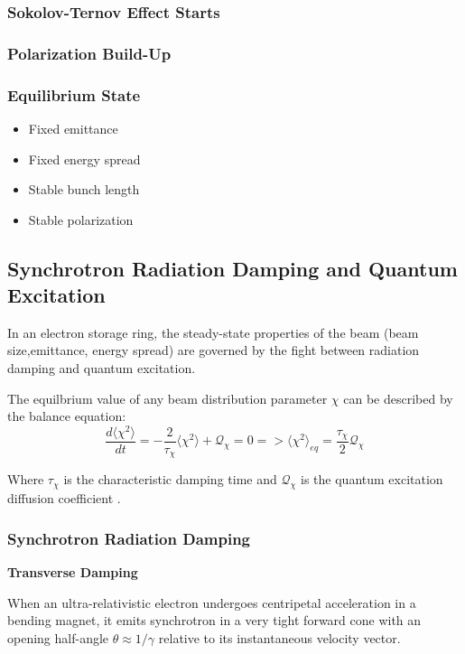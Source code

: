 \documentclass{article}
\begin{document}
\subsubsection{Sokolov-Ternov Effect Starts}

\subsubsection{Polarization Build-Up}

\subsubsection{Equilibrium State}
\begin{itemize}
\item Fixed emittance 
\item Fixed energy spread
\item Stable bunch length
\item Stable polarization
\end{itemize}

\subsection{Synchrotron Radiation Damping and Quantum Excitation}

In an electron storage ring, the steady-state properties of the beam (beam size,emittance, energy spread) are governed by the fight between radiation damping and quantum excitation.

The equilbrium value of any beam distribution parameter $\chi$ can be described by the balance equation:
$$\frac{d \langle \chi^2 \rangle}{dt}=-\frac{2}{\tau_\chi}\langle \chi^2 \rangle + \mathcal{Q}_{\chi}=0 => \langle \chi^2 \rangle_{eq} = \frac{\tau_\chi}{2} \mathcal{Q}_{\chi}$$

Where $\tau_{\chi}$ is the characteristic damping time and $\mathcal{Q}_\chi$ is the quantum excitation diffusion coefficient \cite{Sands1970}.

\subsubsection{Synchrotron Radiation Damping}
\textbf{Transverse Damping}

When an ultra-relativistic electron undergoes centripetal acceleration in a bending magnet, it emits synchrotron in a very tight forward cone with an opening half-angle $\theta \approx 1/\gamma$ relative to its instantaneous velocity vector. \cite{Jackson1999}
\end{document}
